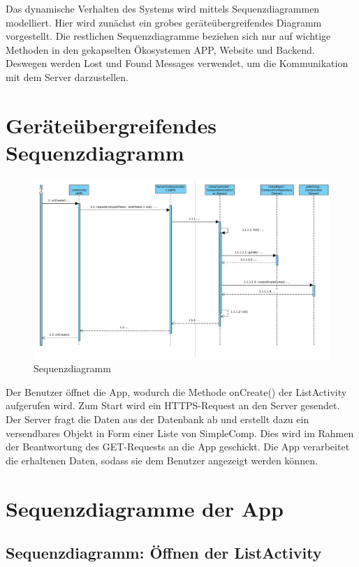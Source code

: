 	Das dynamische Verhalten des Systems wird mittels Sequenzdiagrammen modelliert.
	Hier wird zunächst ein grobes geräteübergreifendes Diagramm vorgestellt.
	Die restlichen Sequenzdiagramme beziehen sich nur auf wichtige Methoden in den gekapselten Ökosystemen APP, Website und Backend. Deswegen werden Lost und Found Messages verwendet, um die Kommunikation mit dem Server darzustellen. 
	
\section*{Geräteübergreifendes Sequenzdiagramm}

\begin{figure}[h]
	\centering
	\includegraphics[width=\textwidth]{img/Diagramme/Sequenz/Overview}
	\caption{Sequenzdiagramm}
	\label{fig:sequenz-overview}
\end{figure}
\noindent
Der Benutzer öffnet die App, wodurch die Methode onCreate() der ListActivity aufgerufen wird. Zum Start wird ein HTTPS-Request an den Server gesendet. Der Server fragt die Daten aus der Datenbank ab und erstellt dazu ein versendbares Objekt in Form einer Liste von SimpleComp. Dies wird im Rahmen der Beantwortung des GET-Requests an die App geschickt. Die App verarbeitet die erhaltenen Daten, sodass sie dem Benutzer angezeigt werden können.

\section*{Sequenzdiagramme der App}
\subsection*{Sequenzdiagramm: Öffnen der ListActivity}

